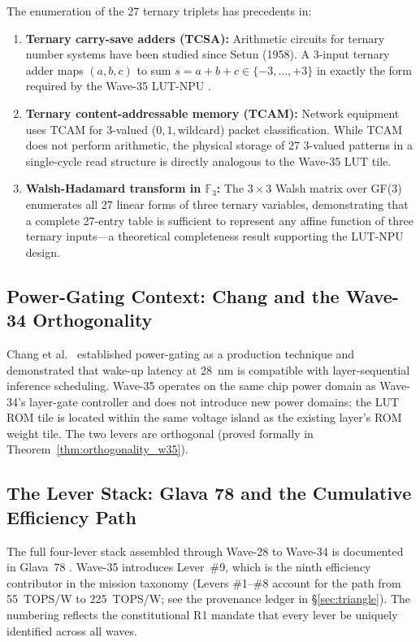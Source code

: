 The enumeration of the 27 ternary triplets has precedents in:

\begin{enumerate}
  \item \textbf{Ternary carry-save adders (TCSA):}  Arithmetic circuits for
    ternary number systems have been studied since Setun (1958).  A 3-input
    ternary adder maps $(a,b,c)$ to sum $s = a+b+c \in \{-3,\ldots,+3\}$
    in exactly the form required by the Wave-35 LUT-NPU \cite{lee_intro_topology}.

  \item \textbf{Ternary content-addressable memory (TCAM):}  Network equipment
    uses TCAM for 3-valued ($0, 1, \mathrm{wildcard}$) packet classification.
    While TCAM does not perform arithmetic, the physical storage of 27 3-valued
    patterns in a single-cycle read structure is directly analogous to the
    Wave-35 LUT tile.

  \item \textbf{Walsh-Hadamard transform in $\mathbb{F}_3$:}  The $3\times 3$
    Walsh matrix over GF(3) enumerates all 27 linear forms of three ternary
    variables, demonstrating that a complete 27-entry table is sufficient to
    represent any affine function of three ternary inputs---a theoretical
    completeness result supporting the LUT-NPU design.
\end{enumerate}

\subsection{Power-Gating Context: Chang and the Wave-34 Orthogonality}

Chang et al.\ \cite{chang_power_gating_2006} established power-gating
as a production technique and demonstrated that wake-up latency at 28~nm is
compatible with layer-sequential inference scheduling.  Wave-35 operates on
the same chip power domain as Wave-34's layer-gate controller and does not
introduce new power domains; the LUT ROM tile is located within the same
voltage island as the existing layer's ROM weight tile.  The two levers are
orthogonal (proved formally in Theorem~\ref{thm:orthogonality_w35}).

\subsection{The Lever Stack: Glava 78 and the Cumulative Efficiency Path}

The full four-lever stack assembled through Wave-28 to Wave-34 is documented
in Glava~78 \cite{glava78_lever_stack}.  Wave-35 introduces Lever~\#9, which
is the ninth efficiency contributor in the mission taxonomy (Levers \#1--\#8
account for the path from 55~TOPS/W to 225~TOPS/W; see the provenance ledger
in \S\ref{sec:triangle}).  The numbering reflects the constitutional R1 mandate
that every lever be uniquely identified across all waves.

